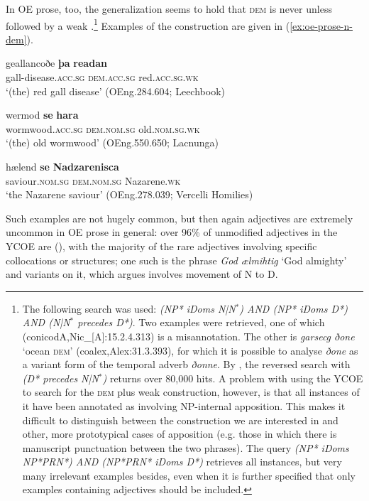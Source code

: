 \documentclass[output=paper,colorlinks,citecolor=brown]{langscibook}
\begin{document}
In OE prose, too, the generalization seems to hold that \textsc{dem} is never  unless followed by a weak .\footnote{The following search was used: \textit{(NP* iDoms N|N$^*$) AND (NP* iDoms D*) AND (N|N$^*$ precedes D*)}. Two examples were retrieved, one of which (conicodA,Nic\_[A]:15.2.4.313) is a misannotation. The other is \emph{garsecg ðone} `ocean \textsc{dem}' (coalex,Alex:31.3.393), for which it is possible to analyse \emph{ðone} as a variant form of the temporal adverb \emph{ðonne}. By , the reversed search with \textit{(D* precedes N|N$^*$)} returns over 80,000 hits. A problem with using the YCOE to search for the  \textsc{dem} plus weak  construction, however, is that all instances of it have been annotated as involving NP-internal apposition. This makes it difficult to distinguish between the construction we are interested in and other, more prototypical cases of apposition (e.g. those in which there is manuscript punctuation between the two phrases). The query \textit{(NP* iDoms NP*PRN*) AND (NP*PRN* iDoms D*)} retrieves all instances, but very many irrelevant examples besides, even when it is further specified that only examples containing adjectives should be included.} Examples of the construction are given in (\ref{ex:oe-prose-n-dem}).

\begin{exe}
 \ex\label{ex:oe-prose-n-dem}
 \begin{xlist}
  \ex\gll geallancoðe \textbf{þa} \textbf{readan}\\
  gall-disease.\textsc{acc.sg} \textsc{dem.acc.sg} red.\textsc{acc.sg.wk}\\
  \glt `(the) red gall disease' (OEng.284.604; Leechbook)
  
  \ex\gll wermod \textbf{se} \textbf{hara}\\
  wormwood.\textsc{acc.sg} \textsc{dem.nom.sg} old.\textsc{nom.sg.wk}\\
  \glt `(the) old wormwood' (OEng.550.650; Lacnunga)
  
  \ex\gll hælend \textbf{se} \textbf{Nadzarenisca}\\
  saviour.\textsc{nom.sg} \textsc{dem.nom.sg} Nazarene.\textsc{wk}\\
  \glt `the Nazarene saviour' (OEng.278.039; Vercelli Homilies)
 \end{xlist}
\end{exe}

Such examples are not hugely common, but then again  adjectives are extremely uncommon in OE prose in general: over 96\% of unmodified adjectives in the YCOE are  (), with the majority of the rare  adjectives involving specific collocations or structures; one such is the phrase \emph{God ælmihtig} `God almighty' and variants on it, which \citet{Crisma1999} argues involves movement of N to D. 
\end{document}
